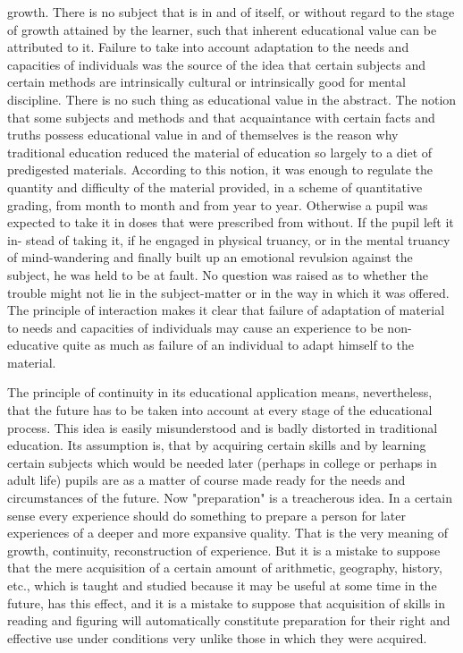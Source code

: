 growth. There is no subject that is in and of itself, or without regard to the stage of 
growth attained by the learner, such that inherent educational value can be attributed to it. 
Failure to take into account adaptation to the needs and capacities of individuals was the 
source of the idea that certain subjects and certain methods are intrinsically cultural or 
intrinsically good for mental discipline. There is no such thing as educational value in the 
abstract. The notion that some subjects and methods and that acquaintance with certain 
facts and truths possess educational value in and of themselves is the reason why 
traditional education reduced the material of education so largely to a diet of predigested 
materials. According to this notion, it was enough to regulate the quantity and difficulty 
of the material provided, in a scheme of quantitative grading, from month to month and 
from year to year. Otherwise a pupil was expected to take it in doses that were prescribed 
from without. If the pupil left it in- stead of taking it, if he engaged in physical truancy, or 
in the mental truancy of mind-wandering and finally built up an emotional revulsion 
against the subject, he was held to be at fault. No question was raised as to whether the 
trouble might not lie in the subject-matter or in the way in which it was offered. The 
principle of interaction makes it clear that failure of adaptation of material to needs and 
capacities of individuals may cause an experience to be non-educative quite as much as 
failure of an individual to adapt himself to the material. 

The principle of continuity in its educational application means, nevertheless, that the 
future has to be taken into account at every stage of the educational process. This idea is 
easily misunderstood and is badly distorted in traditional education. Its assumption is, 
that by acquiring certain skills and by learning certain subjects which would be needed 
later (perhaps in college or perhaps in adult life) pupils are as a matter of course made 
ready for the needs and circumstances of the future. Now "preparation" is a treacherous 
idea. In a certain sense every experience should do something to prepare a person for 
later experiences of a deeper and more expansive quality. That is the very meaning of 
growth, continuity, reconstruction of experience. But it is a mistake to suppose that the 
mere acquisition of a certain amount of arithmetic, geography, history, etc., which is 
taught and studied because it may be useful at some time in the future, has this effect, and 
it is a mistake to suppose that acquisition of skills in reading and figuring will 
automatically constitute preparation for their right and effective use under conditions 
very unlike those in which they were acquired. 

